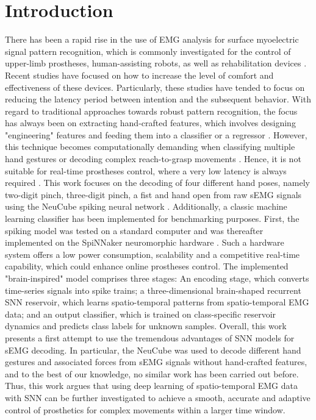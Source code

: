\documentclass[journal,article,submit,moreauthors,pdftex,10pt,a4paper]{Definitions/mdpi}
\begin{document}


\section{Introduction}
There has been a rapid rise in the use of EMG analysis for surface myoelectric signal pattern recognition, which is commonly investigated for the control of upper-limb prostheses, human-assisting robots, as well as  rehabilitation devices \cite{1}. Recent studies have focused on how to increase the level of comfort and effectiveness of these devices. Particularly, these studies have tended to focus on reducing the latency period between intention and the subsequent behavior. With regard to traditional approaches towards robust pattern recognition, the focus has always been on extracting hand-crafted features, which involves designing "engineering" features and feeding them into a classifier or a regressor \cite{2}. However, this technique becomes computationally demanding when classifying multiple hand gestures \cite{3} or decoding complex reach-to-grasp movements \cite{4}. Hence, it is not suitable for real-time prostheses control, where a very low latency is always required \cite{5}.
This work focuses on the decoding of four different hand poses, namely two-digit pinch, three-digit pinch, a fist and hand open from raw sEMG signals using the NeuCube spiking neural network \cite{6}. Additionally, a classic machine learning classifier has been implemented for benchmarking purposes. First, the spiking model was tested on a standard computer and was thereafter implemented on the SpiNNaker neuromorphic hardware \cite{7}. Such a hardware system offers a low power consumption, scalability and a competitive real-time capability, which could enhance online prostheses control.   
The implemented "brain-inspired" model comprises three stages: An encoding stage, which converts time-series signals into spike trains; a three-dimensional brain-shaped recurrent SNN reservoir, which learns spatio-temporal patterns from spatio-temporal EMG data; and an output classifier, which is trained on class-specific reservoir dynamics and predicts class labels for unknown samples. 
Overall, this  work  presents a  first  attempt  to  use the tremendous advantages of SNN models for sEMG decoding. In particular, the NeuCube was used to decode different hand gestures and associated forces from sEMG signals without hand-crafted features, and to the best of our knowledge, no similar work has been carried out before. Thus, this work argues that using deep learning of spatio-temporal EMG data with SNN can be further investigated to achieve a smooth, accurate and adaptive control of prosthetics for complex movements within a larger time window. 
\end{document}
